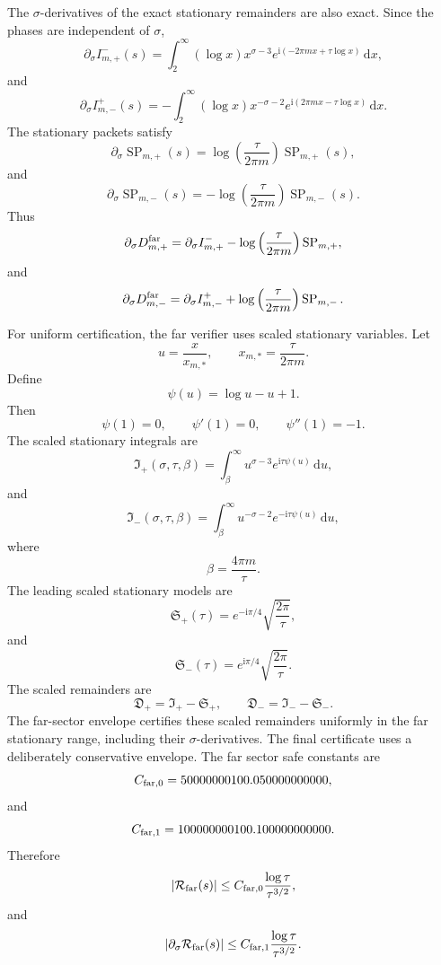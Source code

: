 \documentclass[11pt]{article}
\newcommand{\ii}{\mathrm{i}}
\newcommand{\dd}{\mathrm{d}}
\newcommand{\s}{s}
\newcommand{\sig}{\sigma}
\newcommand{\tauh}{\tau}
\newcommand{\Rfar}{\mathcal R_{\rm far}}
\begin{document}
The \(\sig\)-derivatives of the exact stationary remainders are also exact.
Since the phases are independent of \(\sig\),
\[
        \partial_\sig I_{m,+}^{-}(\s)
        =
        \int_2^\infty
        (\log x)x^{\sig-3}
        e^{\ii(-2\pi m x+\tauh\log x)}
        \,\dd x,
\]
and
\[
        \partial_\sig I_{m,-}^{+}(\s)
        =
        -
        \int_2^\infty
        (\log x)x^{-\sig-2}
        e^{\ii(2\pi m x-\tauh\log x)}
        \,\dd x.
\]
The stationary packets satisfy
\[
        \partial_\sig\operatorname{SP}_{m,+}(\s)
        =
        \log\left(\frac{\tauh}{2\pi m}\right)
        \operatorname{SP}_{m,+}(\s),
\]
and
\[
        \partial_\sig\operatorname{SP}_{m,-}(\s)
        =
        -
        \log\left(\frac{\tauh}{2\pi m}\right)
        \operatorname{SP}_{m,-}(\s).
\]
Thus
\[
        \partial_\sig D_{m,+}^{\rm far}
        =
        \partial_\sig I_{m,+}^{-}
        -
        \log\left(\frac{\tauh}{2\pi m}\right)
        \operatorname{SP}_{m,+},
\]
and
\[
        \partial_\sig D_{m,-}^{\rm far}
        =
        \partial_\sig I_{m,-}^{+}
        +
        \log\left(\frac{\tauh}{2\pi m}\right)
        \operatorname{SP}_{m,-}.
\]

For uniform certification, the far verifier uses scaled stationary variables.
Let
\[
        u=\frac{x}{x_{m,*}},
        \qquad
        x_{m,*}=\frac{\tauh}{2\pi m}.
\]
Define
\[
        \psi(u)=\log u-u+1.
\]
Then
\[
        \psi(1)=0,
        \qquad
        \psi'(1)=0,
        \qquad
        \psi''(1)=-1.
\]
The scaled stationary integrals are
\[
        \mathfrak I_+(\sig,\tauh,\beta)
        =
        \int_\beta^\infty
        u^{\sig-3}
        e^{\ii\tauh\psi(u)}
        \,\dd u,
\]
and
\[
        \mathfrak I_-(\sig,\tauh,\beta)
        =
        \int_\beta^\infty
        u^{-\sig-2}
        e^{-\ii\tauh\psi(u)}
        \,\dd u,
\]
where
\[
        \beta=\frac{4\pi m}{\tauh}.
\]
The leading scaled stationary models are
\[
        \mathfrak S_+(\tauh)
        =
        e^{-\ii\pi/4}\sqrt{\frac{2\pi}{\tauh}},
\]
and
\[
        \mathfrak S_-(\tauh)
        =
        e^{\ii\pi/4}\sqrt{\frac{2\pi}{\tauh}}.
\]
The scaled remainders are
\[
        \mathfrak D_+
        =
        \mathfrak I_+-\mathfrak S_+,
        \qquad
        \mathfrak D_-
        =
        \mathfrak I_- - \mathfrak S_-.
\]
The far-sector envelope certifies these scaled remainders uniformly in the far
stationary range, including their \(\sig\)-derivatives.  The final certificate
uses a deliberately conservative envelope.  The far sector safe constants are
\[
        C_{{\rm far},0}
        =
        50000000100.050000000000,
\]
and
\[
        C_{{\rm far},1}
        =
        100000000100.100000000000.
\]
Therefore
\[
        |\Rfar(\s)|
        \le
        C_{{\rm far},0}
        \frac{\log\tauh}{\tauh^{3/2}},
\]
and
\[
        |\partial_\sig\Rfar(\s)|
        \le
        C_{{\rm far},1}
        \frac{\log\tauh}{\tauh^{3/2}}.
\]
\end{document}
